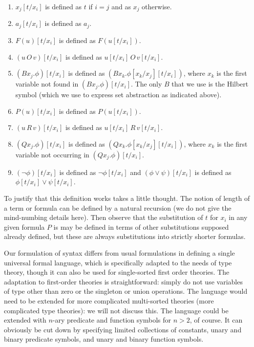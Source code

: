 \documentclass[12pt]{book}
\begin{document}
\begin{enumerate}

\item $x_j[t/x_i]$ is defined as $t$ if $i=j$ and as $x_j$ otherwise.

\item $a_j[t/x_i]$ is defined as $a_j$.

\item $F(u)[t/x_i]$ is defined as $F(u[t/x_i])$.

\item $(u \,O\, v)[t/x_i]$ is defined as $u[t/x_i]\,O\,v[t/x_i]$.

\item $(Bx_j.\phi)[t/x_i]$ is defined as
$(Bx_k.\phi[x_k/x_j][t/x_i])$, where $x_k$ is the first variable not
found in $(Bx_j.\phi)[t/x_i]$.  
The only $B$ that we use is the Hilbert symbol (which we use to express set abstraction as indicated above).

\item $P(u)[t/x_i]$ is defined as $P(u[t/x_i])$.

\item $(u \, R \, v)[t/x_i]$ is defined as $u[t/x_i]\,R\,v[t/x_i]$.

\item $(Qx_j.\phi)[t/x_i]$ is defined as
$(Qx_k.\phi[x_k/x_j][t/x_i])$, where $x_k$ is the first variable not
occurring in $(Qx_j.\phi)[t/x_i]$. 

\item $(\neg\phi)[t/x_i]$ is defined as $\neg\phi[t/x_i]$ and $(\phi
\vee \psi)[t/x_i]$ is defined as $\phi[t/x_i] \vee \psi[t/x_i]$.

\end{enumerate}

To justify that this definition works takes a little thought.  The
notion of length of a term or formula can be defined by a natural
recursion (we do not give the mind-numbing details here).  Then
observe that the substitution of $t$ for $x_i$ in any given formula
$P$ is may be defined in terms of other substitutions supposed already
defined, but these are always substitutions into strictly shorter
formulas.

Our formulation of syntax differs from usual formulations in defining
a single universal formal language, which is specifically adapted to
the needs of type theory, though it can also be used for single-sorted
first order theories.  The adaptation to first-order theories is
straightforward: simply do not use variables of type other than zero or
the singleton or union operations.  The language would need to be
extended for more complicated multi-sorted theories (more complicated
type theories): we will not discuss this.  The language could be
extended with $n$-ary predicate and function symbols for $n>2$, of
course.  It can obviously be cut down by specifying limited
collections of constants, unary and binary predicate symbols, and
unary and binary function symbols.
\end{document}
